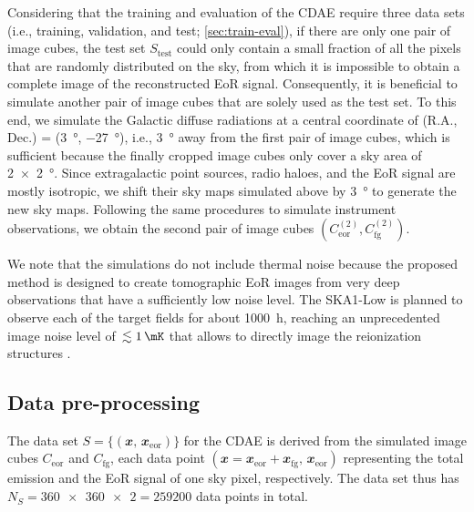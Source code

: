 \documentclass[fleqn,usenatbib]{mnras}
\newcommand{\R}[1]{\mathrm{#1}}
\newcommand{\B}[1]{\mathbfit{#1}}
\begin{document}
Considering that the training and evaluation of the CDAE require three
data sets (i.e., training, validation, and test; \autoref{sec:train-eval}),
if there are only one pair of image cubes, the test set $S_{\R{test}}$
could only contain a small fraction of all the pixels that are randomly
distributed on the sky, from which it is impossible to obtain a complete
image of the reconstructed EoR signal.
Consequently, it is beneficial to simulate another pair of image cubes
that are solely used as the test set.
To this end, we simulate the Galactic diffuse radiations at a central
coordinate of (R.A., Dec\@.) = (\SI{3}{\degree}, \SI{-27}{\degree}), i.e.,
\SI{3}{\degree} away from the first pair of image cubes, which is
sufficient because the finally cropped image cubes only cover a sky area of
\SI{2 x 2}{\degree}.
Since extragalactic point sources, radio haloes, and the EoR signal are
mostly isotropic, we shift their sky maps simulated above by
\SI{3}{\degree} to generate the new sky maps.
Following the same procedures to simulate instrument observations, we
obtain the second pair of image cubes
$\left( C_{\R{eor}}^{(2)}, C_{\R{fg}}^{(2)} \right)$.

We note that the simulations do not include thermal noise because the
proposed method is designed to create tomographic EoR images from very deep
observations that have a sufficiently low noise level.
The SKA1-Low is planned to observe each of the target fields for
about \SI{1000}{\hour}, reaching an unprecedented image noise level of
$\,\lesssim \SI{1}{\mK}$ that allows to directly image the reionization
structures \citep[e.g.,][]{mellema2013rev,mellema2015,koopmans2015rev}.


\subsection{Data pre-processing}
\label{sec:preprocessing}

The data set $S = \{(\B{x}, \,\B{x}_{\R{eor}})\}$ for the CDAE is derived
from the simulated image cubes $C_{\R{eor}}$ and $C_{\R{fg}}$, each data
point $(\B{x} = \B{x}_{\R{eor}} + \B{x}_{\R{fg}}, \,\B{x}_{\R{eor}})$
representing the total emission and the EoR signal of one sky pixel,
respectively.
The data set thus has $N_S = \num{360x360 x 2} = \num{259200}$
data points in total.
\end{document}
